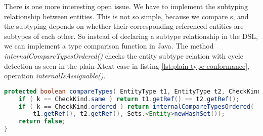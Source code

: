 There is one more interesting open issue. We have to implement the subtyping
relationship between entities. This is not so simple, because we compare
s, and the subtyping depends on whether their corresponding
referenced entities are subtypes of each other. So instead of declaring a
subtype relationship in the DSL, we can implement a type comparison function in
Java. The method \emph{internalCompareTypesOrdered()} checks the entity subtype
relation with cycle detection as seen in the plain Xtext case in listing
\ref{lst:plain-type-conformance}, operation \emph{internalIsAssignable()}.


\begin{lstlisting}[language=Java]
protected boolean compareTypes( EntityType t1, EntityType t2, CheckKind k, TypeCalculationTrace trace ) {
    if ( k == CheckKind.same ) return t1.getRef() == t2.getRef();
    if ( k == CheckKind.ordered ) return internalCompareTypesOrdered(
        t1.getRef(), t2.getRef(), Sets.<Entity>newHashSet());
    return false; 
}
\end{lstlisting}


  
